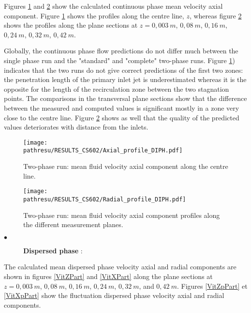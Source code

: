 \documentclass[a4paper,twoside,12pt]{article}
\newcommand{\pathresu}{./FIGURES}
\begin{document}
Figures \ref{AxeFluide_diph} and \ref{ProfVZFluide_diph} show the calculated continuous phase mean velocity axial component. Figure \ref{AxeFluide_diph} shows the profiles along the centre line, $z$, whereas figure \ref{ProfVZFluide_diph} shows the profiles along the plane sections at $z = 0,003~m$, $0,08~m$, $0,16~m$, $0,24~m$, $0,32~m$, $0,42~m$.

\noindent
Globally, the continuous phase flow predictions do not differ much between the single phase run and the "standard" and "complete" two-phase runs. Figure \ref{AxeFluide_diph}) indicates that the two runs do not give correct predictions of the first two zones: the penetration length of the primary inlet jet is underestimated whereas it is the opposite for the length of the recirculation zone between the two stagnation points. The comparisons in the transversal plane sections show that the difference between the measured and computed values is significant mostly in a zone very close to the centre line. Figure \ref{ProfVZFluide_diph} shows as well that the quality of the predicted values deteriorates with distance from the inlets.

\begin{figure}[h]
   \centerline{\texttt{[image: \\pathresu/RESULTS\_CS602/Axial\_profile\_DIPH.pdf]}}
   \caption{Two-phase run: mean fluid velocity axial component along the centre line.}
   \label{AxeFluide_diph}
\end{figure}

\begin{figure}[h]
   \centerline{\texttt{[image: \\pathresu/RESULTS\_CS602/Radial\_profile\_DIPH.pdf]}}
   \caption{Two-phase run: mean fluid velocity axial component profiles along the different measurement planes.}
   \label{ProfVZFluide_diph}
\end{figure}

\begin{description}
   \item[$\bullet$] \textbf{Dispersed phase} :
\end{description}
\noindent

The calculated mean dispersed phase velocity axial and radial components are shown in figures \ref{VitZPart} and \ref{VitXPart} along the plane sections at $z = 0,003~m$, $0,08~m$, $0,16~m$, $0,24~m$, $0,32~m$, and $0,42~m$.
Figures \ref{VitZpPart} et \ref{VitXpPart} show the fluctuation dispersed phase velocity axial and radial components.
\end{document}
